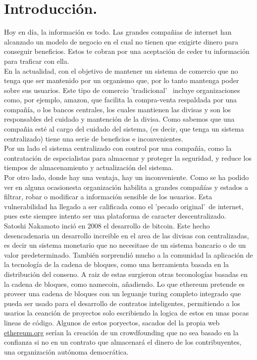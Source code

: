 \documentclass[11pt,a4paper]{article}
\begin{document}
\section{Introducción.}
Hoy en día, la información es todo. Las grandes compañias de internet han alcanzado un modelo  de negocio en el cual no tienen que exigirte dinero para conseguir beneficios. Estos te cobran por una aceptación de ceder tu información para traficar con ella. \\

En la actualidad, con el objetivo de mantener un sistema de comercio que no tenga que ser mantenido por un organismo que, por lo tanto mantenga poder sobre sus usuarios. Este tipo de comercio 'tradicional' \ incluye organizaciones como, por ejemplo, amazon, que facilita la compra-venta respaldada por una compañía, o los bancos centrales, los cuales mantienen las divisas y son los responsables del cuidado y mantención de la divisa. Como sabemos que una compañia esté al cargo del cuidado del sistema, (es decir, que tenga un sistema centralizado) tiene una serie de beneficios e inconvenientes. \\

Por un lado el sistema centralizado con control por una compañía, como la contratación de especialistas para almacenar y proteger la seguridad, y reduce los tiempos de almacenamiento y actualización del sistema. \\

Por otro lado, donde hay una ventaja, hay un inconveniente. Como se ha podido ver en alguna ocasion\footnotemark esta organización habilita a grandes compañías y estados a filtrar, robar o modificar a información sensible  de los usuarios. Esta vulnerabilidad ha llegado a ser calificada como el 'pecado original'\ de internet, pues este siempre intento ser una plataforma de caracter descentralizado.\\

Satoshi Nakamoto inció en 2008 el desarrollo de bitcoin. Este hecho desencadenaria un desarrollo increible en el area de las divisas con centralizadas, es decir un sistema monetario que no necesitase de un sistema bancario o de un valor predeterminado. También sorprendió mucho a la comunidad la aplicación de la tecnología de la cadena de bloques, como una herramienta basada en la distribución del conseno. A raiz de estas surgieron otras teconologías basadas en la cadena de bloques, como namecoin, añadiendo. Lo que ethereum pretende es proveer una cadena de bloques con un leguanje turing completo integrado que pueda ser usado para el desarrollo de contratos inteligentes, permitiendo a los usarios la ceanción de proyectos solo escribiendo la logica de estos en unas pocas lineas de código. Algunos de estos poryectos, sacados del la propia web \url{ethereum.org} serían la creación de un crowdfounding que no sea basado en la confianza si no en un contrato que almacenará el dinero de los contribuyentes, una organización autónoma democrática.\\
\end{document}
